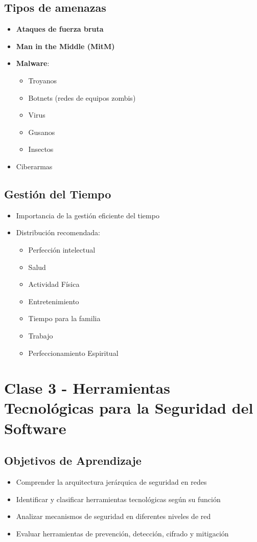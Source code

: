 \documentclass[12pt,a4paper]{article}
\begin{document}
\subsection{Tipos de amenazas}
\begin{itemize}
    \item \textbf{Ataques de fuerza bruta}
    \item \textbf{Man in the Middle (MitM)}
    \item \textbf{Malware}:
    \begin{itemize}
        \item Troyanos
        \item Botnets (redes de equipos zombis)
        \item Virus
        \item Gusanos
        \item Insectos
    \end{itemize}
    \item Ciberarmas
\end{itemize}

\subsection{Gestión del Tiempo}
\begin{itemize}
    \item Importancia de la gestión eficiente del tiempo
    \item Distribución recomendada:
    \begin{itemize}
        \item Perfección intelectual
        \item Salud
        \item Actividad Física
        \item Entretenimiento
        \item Tiempo para la familia
        \item Trabajo
        \item Perfeccionamiento Espiritual
    \end{itemize}
\end{itemize}

\section{Clase 3 - Herramientas Tecnológicas para la Seguridad del Software}
\subsection{Objetivos de Aprendizaje}
\begin{itemize}
    \item Comprender la arquitectura jerárquica de seguridad en redes
    \item Identificar y clasificar herramientas tecnológicas según su función
    \item Analizar mecanismos de seguridad en diferentes niveles de red
    \item Evaluar herramientas de prevención, detección, cifrado y mitigación
\end{itemize}
\end{document}
